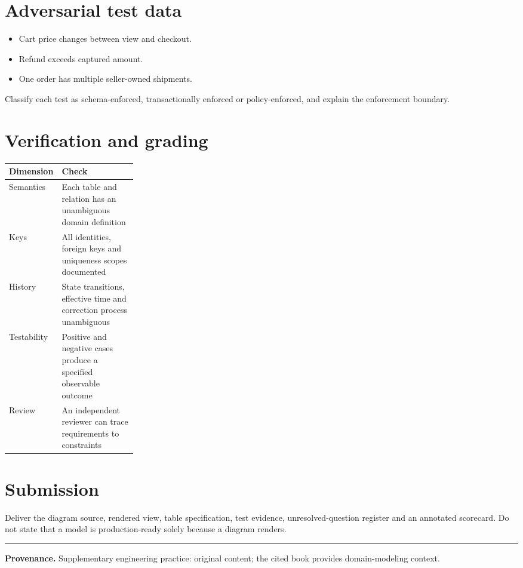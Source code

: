 \documentclass[11pt,letterpaper]{article}
\begin{document}
\section{Adversarial test data}
\begin{itemize}
\item Cart price changes between view and checkout.
\item Refund exceeds captured amount.
\item One order has multiple seller-owned shipments.
\end{itemize}
Classify each test as schema-enforced, transactionally enforced or policy-enforced, and explain the enforcement boundary.


\section{Verification and grading}
\begin{tabularx}{\linewidth}{@{}>{\raggedright\arraybackslash}p{0.25\linewidth}>{\raggedright\arraybackslash}X@{}}
\toprule
\textbf{Dimension} & \textbf{Check} \\ 
\midrule
Semantics & Each table and relation has an unambiguous domain definition \\ 
Keys & All identities, foreign keys and uniqueness scopes documented \\ 
History & State transitions, effective time and correction process unambiguous \\ 
Testability & Positive and negative cases produce a specified observable outcome \\ 
Review & An independent reviewer can trace requirements to constraints \\ 
\bottomrule
\end{tabularx}

\section{Submission}
Deliver the diagram source, rendered view, table specification, test evidence, unresolved-question register and an annotated scorecard. Do not state that a model is production-ready solely because a diagram renders.


\vfill
\hrule
{\footnotesize\textbf{Provenance.} Supplementary engineering practice: original content; the cited book provides domain-modeling context.}
\end{document}
